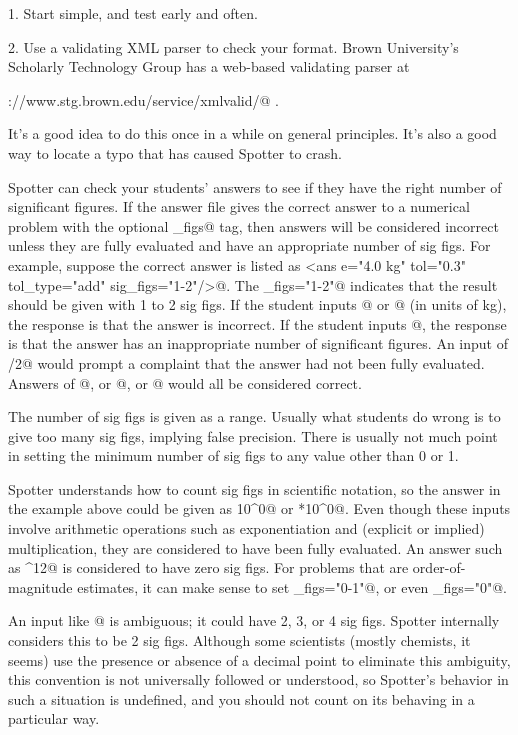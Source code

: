 \documentclass{doc}
\begin{document}
1. Start simple, and test early and often.

2. Use a validating XML parser to check your format. Brown University's
Scholarly Technology Group has a web-based validating parser at

\noindent\verb@http://www.stg.brown.edu/service/xmlvalid/@ \qquad .

It's a good idea to do this once in a while on general principles. It's
also a good way to locate a typo that has caused Spotter to crash.

Spotter can check your students' answers to see if they have the right number of significant figures.
If the answer file gives the correct answer to a numerical problem with the optional
\verb@sig_figs@ tag, then answers will be considered incorrect unless they
are fully evaluated and have an appropriate number of sig figs. For example, suppose
the correct answer is listed as
\verb@<ans e="4.0 kg" tol="0.3" tol_type="add" sig_figs="1-2"/>@. The \verb@sig_figs="1-2"@
indicates that the result should be given with 1 to 2 sig figs.
If the student inputs @ or @ (in units of kg), the response is that the answer is incorrect.
If the student inputs @, the response is that the answer has an inappropriate number
of significant figures.
An input of /2@ would prompt a complaint that the answer had not been fully evaluated.
Answers of @, or @, or @ would all be considered correct.

The number of sig figs is given as a range. Usually what students do wrong is to give too many
sig figs, implying false precision. There is usually not much point in setting the minimum number
of sig figs to any value other than 0 or 1.

Spotter understands how to count sig figs in scientific notation, so
the answer in the example above could be given as  10^0@ or *10^0@.
Even though these inputs involve arithmetic operations such as exponentiation and
(explicit or implied) multiplication, they are considered to have been fully evaluated.
An answer such as ^12@ is considered to have zero sig figs.
For problems that are order-of-magnitude estimates, it can make sense to set \verb@sig_figs="0-1"@,
or even \verb@sig_figs="0"@.

An input like @ is ambiguous; it could have 2, 3, or 4 sig figs. Spotter internally
considers this to be 2 sig figs. Although some scientists (mostly chemists, it seems) use the presence or absence of a decimal
point to eliminate this ambiguity, this convention is not universally followed or understood, so Spotter's behavior
in such a situation is undefined, and you should not count on its behaving in a particular way.
\end{document}
